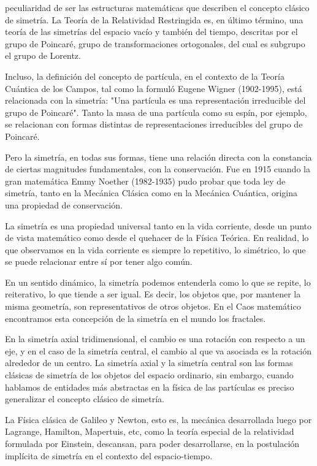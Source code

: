 \documentclass[]{article}
\begin{document}
peculiaridad de ser las estructuras matemáticas que describen el
concepto clásico de simetría. La Teoría de la Relatividad Restringida
es, en último término, una teoría de las simetrías del espacio vacío y
también del tiempo, descritas por el grupo de Poincaré, grupo de
transformaciones ortogonales, del cual es subgrupo el grupo de Lorentz.

Incluso, la definición del concepto de partícula, en el contexto de la
Teoría Cuántica de los Campos, tal como la formuló Eugene Wigner
(1902-1995), está relacionada con la simetría: "Una partícula es una
representación irreducible del grupo de Poincaré". Tanto la masa de una
partícula como su espín, por ejemplo, se relacionan con formas distintas
de representaciones irreducibles del grupo de Poincaré.~

Pero la simetría, en todas sus formas, tiene una relación directa con la
constancia de ciertas magnitudes fundamentales, con la conservación. Fue
en 1915 cuando la gran matemática Emmy Noether (1982-1935) pudo probar
que toda ley de simetría, tanto en la Mecánica Clásica como en la
Mecánica Cuántica, origina una propiedad de conservación.

La simetría es una propiedad universal tanto en la vida corriente, desde
un punto de vista matemático como desde el quehacer de la Física
Teórica. En realidad, lo que observamos en la vida corriente es siempre
lo repetitivo, lo simétrico, lo que se puede relacionar entre sí por
tener algo común.

En un sentido dinámico, la simetría podemos entenderla como lo que se
repite, lo reiterativo, lo que tiende a ser igual. Es decir, los objetos
que, por mantener la misma geometría, son representativos de otros
objetos. En el Caos matemático encontramos esta concepción de la
simetría en el mundo los fractales.

En la simetría axial tridimensional, el cambio es una rotación con
respecto a un eje, y en el caso de la simetría central, el cambio al que
va asociada es la rotación alrededor de un centro. La simetría axial y
la simetría central son las formas clásicas de simetría de los objetos
del espacio ordinario, sin embargo, cuando hablamos de entidades más
abstractas en la física de las partículas es preciso generalizar el
concepto clásico de simetría.~

La Física clásica de Galileo y Newton, esto es, la mecánica desarrollada
luego por Lagrange, Hamilton, Mapertuis, etc, como la teoría especial de
la relatividad formulada por Einstein, descansan, para poder
desarrollarse, en la postulación implícita de simetría en el contexto
del espacio-tiempo.
\end{document}
